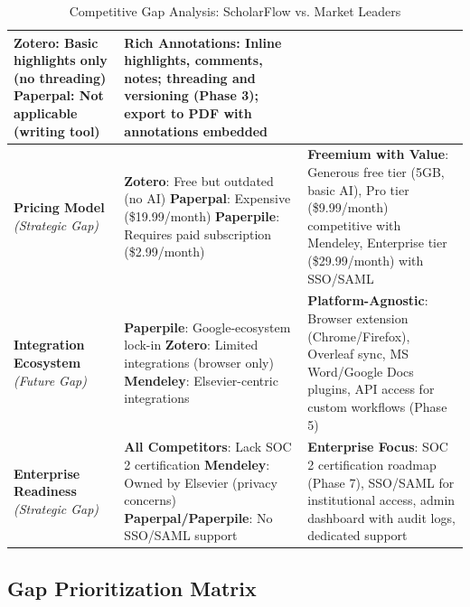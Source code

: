 \begin{table}[H]
\begin{tabularx}{\textwidth}{|p{3.4cm}|X|X|}
        \textbf{Zotero}: Basic highlights only (no threading) \newline
        \textbf{Paperpal}: Not applicable (writing tool)                &
        \textbf{Rich Annotations}: Inline highlights, comments, notes; threading and versioning (Phase 3); export to PDF with annotations embedded                         \\
        \hline
        \textbf{Pricing Model} \newline \textit{(Strategic Gap)}        &
        \textbf{Zotero}: Free but outdated (no AI) \newline
        \textbf{Paperpal}: Expensive (\$19.99/month) \newline
        \textbf{Paperpile}: Requires paid subscription (\$2.99/month)   &
        \textbf{Freemium with Value}: Generous free tier (5GB, basic AI), Pro tier (\$9.99/month) competitive with Mendeley, Enterprise tier (\$29.99/month) with SSO/SAML \\
        \hline
        \textbf{Integration Ecosystem} \newline \textit{(Future Gap)}   &
        \textbf{Paperpile}: Google-ecosystem lock-in \newline
        \textbf{Zotero}: Limited integrations (browser only) \newline
        \textbf{Mendeley}: Elsevier-centric integrations                &
        \textbf{Platform-Agnostic}: Browser extension (Chrome/Firefox), Overleaf sync, MS Word/Google Docs plugins, API access for custom workflows (Phase 5)              \\
        \hline
        \textbf{Enterprise Readiness} \newline \textit{(Strategic Gap)} &
        \textbf{All Competitors}: Lack SOC 2 certification \newline
        \textbf{Mendeley}: Owned by Elsevier (privacy concerns) \newline
        \textbf{Paperpal/Paperpile}: No SSO/SAML support                &
        \textbf{Enterprise Focus}: SOC 2 certification roadmap (Phase 7), SSO/SAML for institutional access, admin dashboard with audit logs, dedicated support            \\
        \hline
    \end{tabularx}
    \caption{Competitive Gap Analysis: ScholarFlow vs. Market Leaders}
    \label{table:gap-analysis}
\end{table}

\subsection{Gap Prioritization Matrix}

